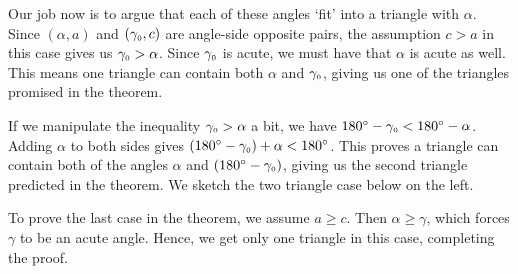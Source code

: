 Our job now is to  argue that each of these angles `fit' into a  triangle with $\alpha$.  Since $(\alpha, a)$ and $(\gamma_{\mbox{\tiny $0$}},c)$ are angle-side opposite pairs,  the assumption $c > a$ in this case gives us $\gamma_{\mbox{\tiny $0$}} > \alpha$. Since $\gamma_{\mbox{\tiny $0$}}$ is acute, we must have that $\alpha$ is acute as well.  This means one triangle  can contain both $\alpha$ and $\gamma_{\mbox{\tiny $0$}}$, giving us one of the triangles promised in the theorem.  

\smallskip

If we manipulate the inequality $\gamma_{\mbox{\tiny $0$}} > \alpha$ a bit, we have  $180^{\circ} - \gamma_{\mbox{\tiny $0$}} < 180^{\circ} - \alpha$.  Adding $\alpha$ to both sides gives $\left(180^{\circ} - \gamma_{\mbox{\tiny $0$}}\right) + \alpha < 180^{\circ}$. This proves a triangle can contain both of the angles $\alpha$ and $\left(180^{\circ} - \gamma_{\mbox{\tiny $0$}}\right)$, giving us the second triangle predicted in the theorem.  We sketch the two triangle case below on the left.

\smallskip

To prove the last case in the theorem, we assume $a \geq c$.  Then $\alpha \geq \gamma$, which forces $\gamma$ to be an acute angle. Hence, we get only one triangle in this case, completing the proof.
 
